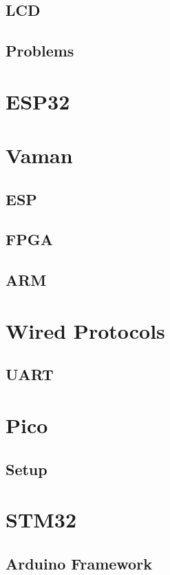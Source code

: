\documentclass[journal]{IEEEtran}
\begin{document}
\subsection{LCD}

\subsection{Problems}

\newpage
\section{ESP32}

\newpage
\section{Vaman}
\subsection{ESP}
%

\subsection{FPGA}

\subsection{ARM}

\newpage
\section{Wired Protocols}
\subsection{UART}

\section{Pico}
\subsection{Setup}

\newpage
\section{STM32}
\subsection{Arduino Framework}

\end{document}
